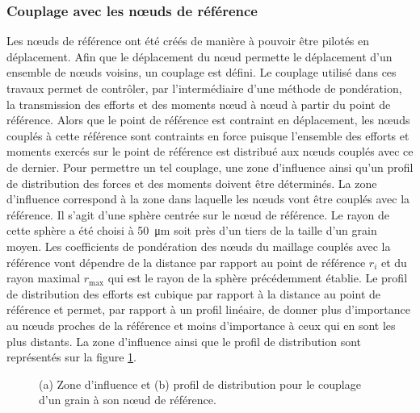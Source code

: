 		\subsubsection{Couplage avec les n\oe{}uds de référence}
			Les n\oe{}uds de référence ont été créés de manière à pouvoir être pilotés en déplacement. Afin que le déplacement du n\oe{}ud permette le déplacement d'un ensemble de n\oe{}uds voisins, un couplage est défini. Le couplage utilisé dans ces travaux permet de contrôler, par l'intermédiaire d'une méthode de pondération, la transmission des efforts et des moments n\oe{}ud à n\oe{}ud à partir du point de référence. Alors que le point de référence est contraint en déplacement, les n\oe{}uds couplés à cette référence sont contraints en force puisque l'ensemble des efforts et moments exercés sur le point de référence est distribué aux n\oe{}uds couplés avec ce de dernier. Pour permettre un tel couplage, une zone d'influence ainsi qu'un profil de distribution des forces et des moments doivent être déterminés. La zone d'influence correspond à la zone dans laquelle les n\oe{}uds vont être couplés avec la référence. Il s'agit d'une sphère centrée sur le n\oe{}ud de référence. Le rayon de cette sphère a été choisi à \SI{50}{\micro\meter} soit près d'un tiers de la taille d'un grain moyen. Les coefficients de pondération des n\oe{}uds du maillage couplés avec la référence vont dépendre de la distance par rapport au point de référence $r_i$ et du rayon maximal $r_\textrm{max}$ qui est le rayon de la sphère précédemment établie. Le profil de distribution des efforts est cubique par rapport à la distance au point de référence et permet, par rapport à un profil linéaire, de donner plus d'importance au n\oe{}uds proches de la référence et moins d'importance à ceux qui en sont les plus distants. La zone d'influence ainsi que le profil de distribution sont représentés sur la figure \ref{fig05:couplage}.
			\begin{figure}\centering
				\hfill
				\caption{\label{fig05:couplage}(a) Zone d'influence et (b) profil de distribution pour le couplage d'un grain à son n\oe{}ud de référence.}
			\end{figure}
